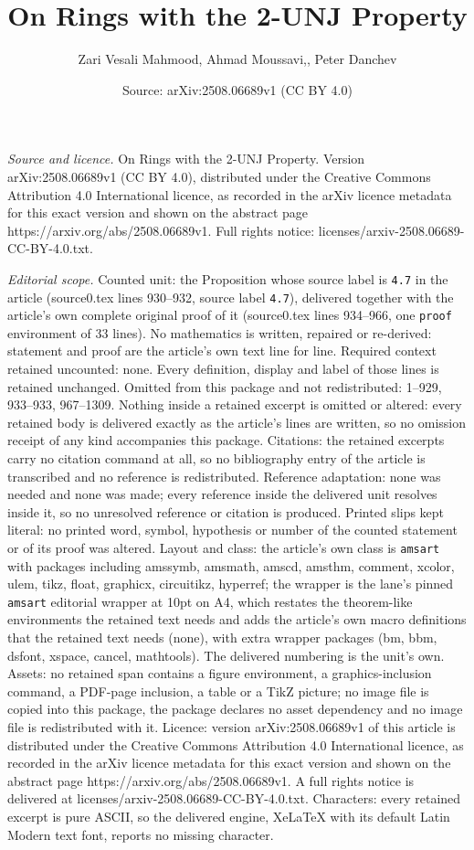 \documentclass[10pt,a4paper]{amsart}
\title[On Rings with the 2-UNJ Property]{On Rings with the 2-UNJ Property}
\author{Zari Vesali Mahmood, Ahmad Moussavi,, Peter Danchev}
\date{Source: arXiv:2508.06689v1 (CC BY 4.0)}
\begin{document}
\maketitle

\noindent\emph{Source and licence.} On Rings with the 2-UNJ Property. Version arXiv:2508.06689v1 (CC BY 4.0), distributed under the Creative Commons Attribution 4.0 International licence, as recorded in the arXiv licence metadata for this exact version and shown on the abstract page https://arxiv.org/abs/2508.06689v1. Full rights notice: licenses/arxiv-2508.06689-CC-BY-4.0.txt.\par\smallskip

\noindent\textit{Editorial scope.} Counted unit: the Proposition whose source label is \texttt{4.7} in the article (source0.tex lines 930--932, source label \texttt{4.7}), delivered together with the article's own complete original proof of it (source0.tex lines 934--966, one \texttt{proof} environment of 33 lines). No mathematics is written, repaired or re-derived: statement and proof are the article's own text line for line. Required context retained uncounted: none. Every definition, display and label of those lines is retained unchanged. Omitted from this package and not redistributed: 1--929, 933--933, 967--1309. Nothing inside a retained excerpt is omitted or altered: every retained body is delivered exactly as the article's lines are written, so no omission receipt of any kind accompanies this package. Citations: the retained excerpts carry no citation command at all, so no bibliography entry of the article is transcribed and no reference is redistributed. Reference adaptation: none was needed and none was made; every reference inside the delivered unit resolves inside it, so no unresolved reference or citation is produced. Printed slips kept literal: no printed word, symbol, hypothesis or number of the counted statement or of its proof was altered. Layout and class: the article's own class is \texttt{amsart} with packages including amssymb, amsmath, amscd, amsthm, comment, xcolor, ulem, tikz, float, graphicx, circuitikz, hyperref; the wrapper is the lane's pinned \texttt{amsart} editorial wrapper at 10pt on A4, which restates the theorem-like environments the retained text needs and adds the article's own macro definitions that the retained text needs (none), with extra wrapper packages (bm, bbm, dsfont, xspace, cancel, mathtools). The delivered numbering is the unit's own. Assets: no retained span contains a figure environment, a graphics-inclusion command, a PDF-page inclusion, a table or a TikZ picture; no image file is copied into this package, the package declares no asset dependency and no image file is redistributed with it. Licence: version arXiv:2508.06689v1 of this article is distributed under the Creative Commons Attribution 4.0 International licence, as recorded in the arXiv licence metadata for this exact version and shown on the abstract page https://arxiv.org/abs/2508.06689v1. A full rights notice is delivered at licenses/arxiv-2508.06689-CC-BY-4.0.txt. Characters: every retained excerpt is pure ASCII, so the delivered engine, XeLaTeX with its default Latin Modern text font, reports no missing character.
\end{document}
